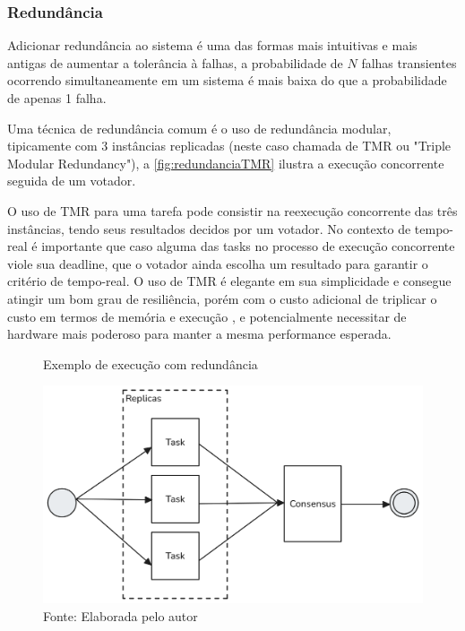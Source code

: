\subsubsection{Redundância}

Adicionar redundância ao sistema é uma das formas mais intuitivas e mais antigas de aumentar a tolerância à falhas, a probabilidade de $N$ falhas transientes ocorrendo simultaneamente em um sistema é mais baixa do que a probabilidade de apenas 1 falha. %

Uma técnica de redundância comum é o uso de redundância modular, tipicamente com 3 instâncias replicadas (neste caso chamada de TMR ou "Triple Modular Redundancy"), a \autoref{fig:redundanciaTMR} ilustra a execução concorrente seguida de um votador.

O uso de TMR para uma tarefa pode consistir na reexecução concorrente das três instâncias, tendo seus resultados decidos por um votador. No contexto de tempo-real é importante que caso alguma das tasks no processo de execução concorrente viole sua deadline, que o votador ainda escolha um resultado para garantir o critério de tempo-real. O uso de TMR é elegante em sua simplicidade e consegue atingir um bom grau de resiliência, porém com o custo adicional de triplicar o custo em termos de memória e execução \cite{DependabilityInEmbeddedSystems}, e potencialmente necessitar de hardware mais poderoso para manter a mesma performance esperada.

\begin{figure}[H]
    \centering
	\captionsetup{justification=centering}
    \caption{Exemplo de execução com redundância}
    \includegraphics[width=1.0\textwidth]{assets/redundancia_tmr.png}
	\captionsetup{justification=raggedright}
    \caption*{Fonte: Elaborada pelo autor}
    \label{fig:redundanciaTMR}
\end{figure}

